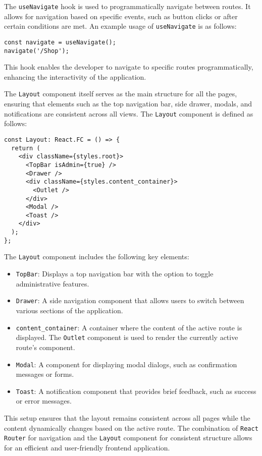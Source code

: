The \texttt{useNavigate} hook is used to programmatically navigate between routes. It allows for navigation based on specific events, such as button clicks or after certain conditions are met. An example usage of \texttt{useNavigate} is as follows:

\begin{verbatim}
const navigate = useNavigate();
navigate('/Shop');
\end{verbatim}

This hook enables the developer to navigate to specific routes programmatically, enhancing the interactivity of the application.

The \texttt{Layout} component itself serves as the main structure for all the pages, ensuring that elements such as the top navigation bar, side drawer, modals, and notifications are consistent across all views. The \texttt{Layout} component is defined as follows:

\begin{verbatim}
const Layout: React.FC = () => {
  return (
    <div className={styles.root}>
      <TopBar isAdmin={true} />
      <Drawer />
      <div className={styles.content_container}>
        <Outlet />
      </div>
      <Modal />
      <Toast />
    </div>
  );
};
\end{verbatim}

The \texttt{Layout} component includes the following key elements:

\begin{itemize}
    \item \texttt{TopBar}: Displays a top navigation bar with the option to toggle administrative features.
    \item \texttt{Drawer}: A side navigation component that allows users to switch between various sections of the application.
    \item \texttt{content\_container}: A container where the content of the active route is displayed. The \texttt{Outlet} component is used to render the currently active route's component.
    \item \texttt{Modal}: A component for displaying modal dialogs, such as confirmation messages or forms.
    \item \texttt{Toast}: A notification component that provides brief feedback, such as success or error messages.
\end{itemize}

This setup ensures that the layout remains consistent across all pages while the content dynamically changes based on the active route. The combination of \texttt{React Router} for navigation and the \texttt{Layout} component for consistent structure allows for an efficient and user-friendly frontend application.


